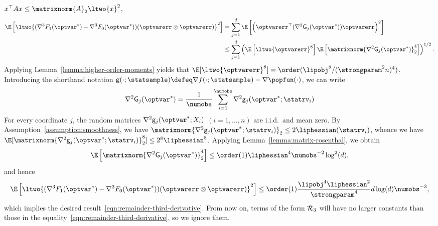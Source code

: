 \documentclass[11pt,twoside]{article}
\theoremstyle{definition}
\begin{document}
$x^\top A x \le \matrixnorm{A}_2 \ltwo{x}^2$,
\begin{align*}
  \E\left[\ltwo{(\nabla^3 F_1(\optvar^*) - \nabla^3 F_0(\optvar^*))(
      \optvarerr \otimes \optvarerr)}^2\right]
  & = \sum_{j = 1}^d \E\left[\left(\optvarerr^\top
    (\nabla^2 \graddiff_j(\optvar^*))
    \optvarerr\right)^2\right] \\
  & \leq \sum_{j=1}^d
  \left(\E\left[\ltwo{\optvarerr}^8\right]
  \E\left[\matrixnorm{\nabla^2 \graddiff_j(\optvar^*)}_2^4\right]
  \right)^{1/2}.
\end{align*}
Applying Lemma~\ref{lemma:higher-order-moments} yields that
$\E[\ltwo{\optvarerr}^8] = \order(\lipobj^8 / (\strongparam^2 n)^4)$.
Introducing the shorthand notation \mbox{$\littlegraddiff(\cdot;
  \statsample) \defeq \nabla f(\cdot; \statsample) - \nabla
  \popfun(\cdot)$,} we can write
\begin{equation*}
  \nabla^2 \graddiff_j(\optvar^*)
  = \frac{1}{\numobs }\sum_{i=1}^\numobs \nabla^2
  \littlegraddiff_j(\optvar^*; \statrv_i)
\end{equation*}
For every coordinate $j$, the random matrices $\nabla^2
\littlegraddiff_j(\optvar^*;X_i)$ $(i=1,\ldots,n)$ are i.i.d.\ and
mean zero. By Assumption~\ref{assumption:smoothness}, we have
$\matrixnorm{\nabla^2 \littlegraddiff_j(\optvar^*; \statrv_i)}_2 \le
2\liphessian(\statrv_i)$, whence we have
\mbox{$\E[\matrixnorm{\nabla^2 \littlegraddiff_j(\optvar^*;
      \statrv_i)}_2^8] \le 2^8 \liphessian^8$.}  Applying
Lemma~\ref{lemma:matrix-rosenthal}, we obtain
\begin{equation*}
  \E\left[\matrixnorm{\nabla^2 \graddiff_j(\optvar^*)}_2^4\right]
  \le \order(1) \liphessian^4 \numobs^{-2} \log^2(d),
\end{equation*}
and hence
\begin{equation*}
  \E\left[\ltwo{(\nabla^3 F_1(\optvar^*) - \nabla^3 F_0(\optvar^*))(
      \optvarerr \otimes \optvarerr)}^2\right]
  \le \order(1)
  \frac{\lipobj^4 \liphessian^2}{\strongparam^4} d \log(d) \numobs^{-3},
\end{equation*}
which implies the desired
result~\eqref{eqn:remainder-third-derivative}. From now on, terms of
the form $\mathcal{R}_3$ will have no larger constants than those in
the equality~\eqref{eqn:remainder-third-derivative}, so we ignore
them.
\end{document}
